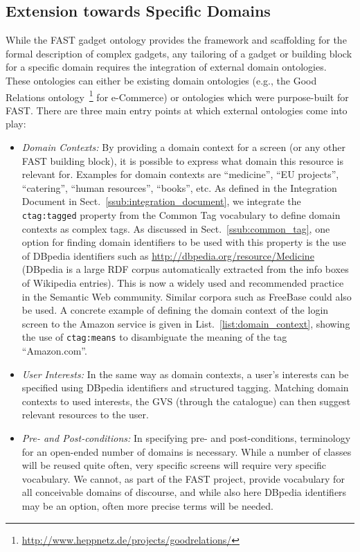 \documentclass[twoside]{fast_latex}
\begin{document}
\subsection{Extension towards Specific Domains} %
\label{sub:extension_towards_specific_domains}

While the FAST gadget ontology provides the framework and scaffolding for the formal description of complex gadgets, any  tailoring of a gadget or building block for a specific domain requires the integration of external domain ontologies. These ontologies can either be existing domain ontologies (e.g., the Good Relations ontology~\cite{Hepp:2008jr}\footnote{\url{http://www.heppnetz.de/projects/goodrelations/}} for e-Commerce) or ontologies which were purpose-built for FAST.
There are three main entry points at which external ontologies come into play:

\begin{itemize}
	\item \emph{Domain Contexts:} By providing a domain context for a screen (or any other FAST building block), it is possible to express what domain this resource is relevant for. Examples for domain contexts are ``medicine'', ``EU projects'', ``catering'', ``human resources'', ``books'', etc. As defined in the Integration Document in Sect.~\ref{ssub:integration_document}, we integrate the \texttt{ctag:tagged} property from the Common Tag vocabulary to define domain contexts as complex tags. As discussed in Sect.~\ref{ssub:common_tag}, one option for finding domain identifiers to be used with this property is the use of DBpedia identifiers such as \url{http://dbpedia.org/resource/Medicine} (DBpedia is a large RDF corpus automatically extracted from the info boxes of Wikipedia entries). This is now a widely used and recommended practice in the Semantic Web community. Similar corpora such as FreeBase could also be used. A concrete example of defining the domain context of the login screen to the Amazon service is given in List.~\ref{list:domain_context}, showing the use of \texttt{ctag:means} to disambiguate the meaning of the tag ``Amazon.com''.
	\item \emph{User Interests:} In the same way as domain contexts, a user's interests can be specified using DBpedia identifiers and structured tagging. Matching domain contexts to used interests, the GVS (through the catalogue) can then suggest relevant resources to the user.
	\item \emph{Pre- and Post-conditions:} In specifying pre- and post-conditions, terminology for an open-ended number of domains is necessary. While a number of classes will be reused quite often, very specific screens will require very specific vocabulary. We cannot, as part of the FAST project, provide vocabulary for all conceivable domains of discourse, and while also here DBpedia identifiers may be an option, often more precise terms will be needed.
\end{itemize}
\end{document}
